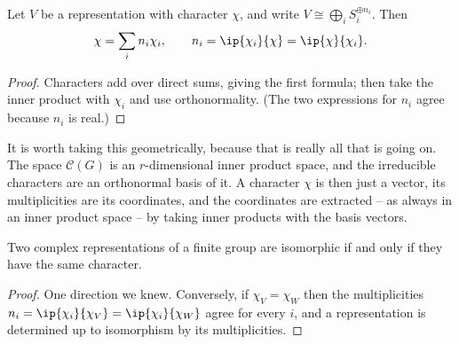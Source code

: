 \begin{corollary}[Decomposition]
	Let $V$ be a representation with character $\chi$, and write $V \cong \bigoplus_i S_i^{\oplus n_i}$. Then
	$$\chi = \sum_i n_i \chi_i, \qquad n_i = \ip{\chi_i}{\chi} = \ip{\chi}{\chi_i}.$$
\end{corollary}
\begin{proof}
	Characters add over direct sums, giving the first formula; then take the inner product with $\chi_i$ and use orthonormality. (The two expressions for $n_i$ agree because $n_i$ is real.)
\end{proof}

It is worth taking this geometrically, because that is really all that is going on. The space $\mathcal C(G)$ is an $r$-dimensional inner product space, and the irreducible characters are an orthonormal basis of it. A character $\chi$ is then just a vector, its multiplicities are its coordinates, and the coordinates are extracted -- as always in an inner product space -- by taking inner products with the basis vectors.

\begin{center}
\end{center}
\vspace{0.3em}

\begin{corollary}
	Two complex representations of a finite group are isomorphic if and only if they have the same character.
\end{corollary}
\begin{proof}
	One direction we knew. Conversely, if $\chi_V = \chi_W$ then the multiplicities $n_i = \ip{\chi_i}{\chi_V} = \ip{\chi_i}{\chi_W}$ agree for every $i$, and a representation is determined up to isomorphism by its multiplicities.
\end{proof}

